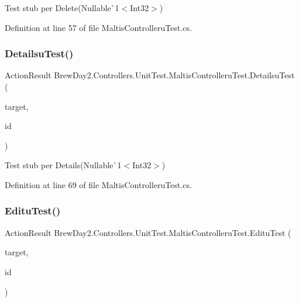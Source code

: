 Test stub per Delete(Nullable\`{}1$<$Int32$>$)



Definition at line 57 of file Maltis\+Controlleru\+Test.\+cs.

\mbox{\label{class_brew_day2_1_1_controllers_1_1_unit_test_1_1_maltis_controlleru_test_af12668bc8cbf6d58351357719ee000e4}} 
\subsubsection{\texorpdfstring{Detailsu\+Test()}{DetailsuTest()}}
{\footnotesize\ttfamily Action\+Result Brew\+Day2.\+Controllers.\+Unit\+Test.\+Maltis\+Controlleru\+Test.\+Detailsu\+Test (\begin{DoxyParamCaption}\item[{\mbox{[}\+Pex\+Assume\+Under\+Test\mbox{]} \mbox{\hyperlink{class_brew_day2_1_1_controllers_1_1_maltis_controller}{Maltis\+Controller}}}]{target,  }\item[{int?}]{id }\end{DoxyParamCaption})}



Test stub per Details(Nullable\`{}1$<$Int32$>$)



Definition at line 69 of file Maltis\+Controlleru\+Test.\+cs.

\mbox{\label{class_brew_day2_1_1_controllers_1_1_unit_test_1_1_maltis_controlleru_test_a70caf67f97ac2742ccc1db8e748c20c4}} 
\subsubsection{\texorpdfstring{Editu\+Test()}{EdituTest()}}
{\footnotesize\ttfamily Action\+Result Brew\+Day2.\+Controllers.\+Unit\+Test.\+Maltis\+Controlleru\+Test.\+Editu\+Test (\begin{DoxyParamCaption}\item[{\mbox{[}\+Pex\+Assume\+Under\+Test\mbox{]} \mbox{\hyperlink{class_brew_day2_1_1_controllers_1_1_maltis_controller}{Maltis\+Controller}}}]{target,  }\item[{int?}]{id }\end{DoxyParamCaption})}



